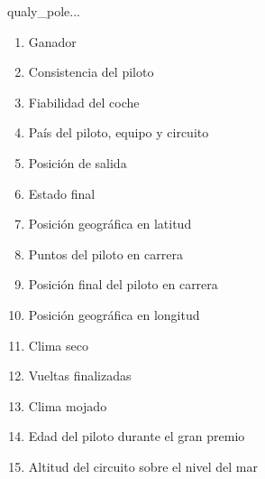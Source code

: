 qualy\_pole...
 \begin{enumerate}
    \item Ganador
    \item Consistencia del piloto
    \item Fiabilidad del coche
    \item País del piloto, equipo y circuito
    \item Posición de salida
    \item Estado final
    \item Posición geográfica en latitud
    \item Puntos del piloto en carrera
    \item Posición final del piloto en carrera
    \item Posición geográfica en longitud
    \item Clima seco
    \item Vueltas finalizadas
    \item Clima mojado
    \item Edad del piloto durante el gran premio
    \item Altitud del circuito sobre el nivel del mar
\end{enumerate}
